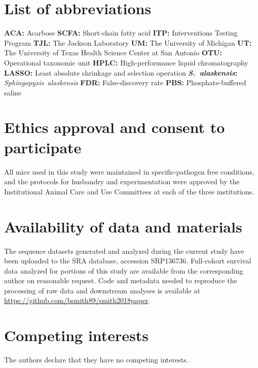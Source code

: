 \documentclass{doc/template/bmcart-nofigbox}
\newcommand{\frnlang}[1]{\textit{#1}}
\newcommand{\taxon}[1]{\frnlang{#1}}
\begin{document}
\begin{backmatter}

\section*{List of abbreviations}

\textbf{ACA:}                  Acarbose
\textbf{SCFA:}                 Short-chain fatty acid
\textbf{ITP:}                  Interventions Testing Program
\textbf{TJL:}                  The Jackson Laboratory
\textbf{UM:}                   The University of Michigan
\textbf{UT:}                   The University of Texas Health Science Center at San Antonio
\textbf{OTU:}                  Operational taxonomic unit
\textbf{HPLC:}                 High-performance liquid chromatography
\textbf{LASSO:}                Least absolute shrinkage and selection operation
\textbf{\taxon{S.~alaskensis}:} \taxon{Sphingopyxis~alaskensis}
\textbf{FDR:}                  False-discovery rate
\textbf{PBS:}                  Phosphate-buffered saline

\section*{Ethics approval and consent to participate}

All mice used in this study were maintained in specific-pathogen free
conditions, and the protocols for husbandry and experimentation were approved
by the Institutional Animal Care and Use Committees at each of the three
institutions.

\section*{Availability of data and materials}

The sequence datasets generated and analyzed during the current
study have been uploaded to the SRA database, accession SRP136736.
Full-cohort survival data analyzed for portions of this study are
available from the corresponding author on reasonable request.
Code and metadata needed to reproduce the processing of raw data and downstream
analyses is available at \url{https://github.com/bsmith89/smith2018paper}.

\section*{Competing interests}

The authors declare that they have no competing interests.


\end{backmatter}
\end{document}
